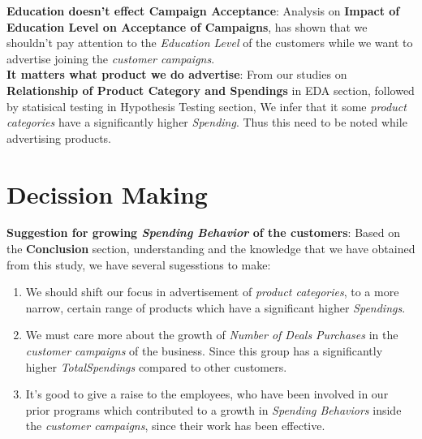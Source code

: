 \documentclass[a4paper,12pt]{article}
\begin{document}
\noindent \textbf{Education doesn't effect Campaign Acceptance}: Analysis on \textbf{Impact of Education Level on Acceptance of Campaigns}, has shown that we shouldn't pay attention to the \textit{Education Level} of the customers while we want to advertise joining the \textit{customer campaigns}. \\ 

\noindent \textbf{It matters what product we do advertise}: From our studies on \textbf{Relationship of Product Category and Spendings} in EDA section, followed by statisical testing in Hypothesis Testing section, 
We infer that it some \textit{product categories} have a significantly higher \textit{Spending}. Thus this need to be noted while advertising products. \\ 


\section*{Decission Making}
\noindent \textbf{Suggestion for growing \textit{Spending Behavior} of the customers}: Based on the \textbf{Conclusion} section, understanding and the knowledge that we have obtained from this study, we have several sugesstions to make:
\begin{enumerate}
    \item We should shift our focus in advertisement of \textit{product categories}, to a more narrow, certain range of products which have a significant higher \textit{Spendings}.
    \item We must care more about the growth of \textit{Number of Deals Purchases} in the \textit{customer campaigns} of the business. Since this group has a significantly higher \textit{TotalSpendings} compared to other customers.
    \item It's good to give a raise to the employees, who have been involved in our prior programs which contributed to a growth in \textit{Spending Behaviors} inside the \textit{customer campaigns}, since their work has been effective.
\end{enumerate} 
\end{document}
